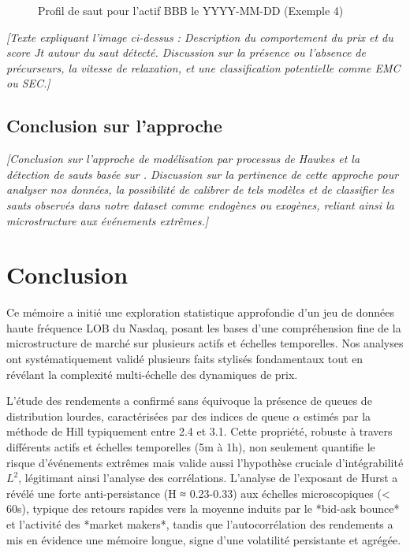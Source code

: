\documentclass[10pt,a4paper]{article}
\theoremstyle{definition}
\theoremstyle{remark}
\begin{document}
\begin{itemize}
    \vspace{1cm}

    \begin{figure}[H]
        \centering
        \fbox{\rule{0pt}{4cm}\qquad\rule{8cm}{0pt}} %
        \caption{Profil de saut pour l'actif BBB le YYYY-MM-DD (Exemple 4)}
        \label{fig:jump_example_4}
    \end{figure}
    \textit{[Texte expliquant l'image ci-dessus : Description du comportement du prix et du score Jt autour du saut détecté. Discussion sur la présence ou l'absence de précurseurs, la vitesse de relaxation, et une classification potentielle comme EMC ou SEC.]}

    \subsection{Conclusion sur l'approche}

    \textit{[Conclusion sur l'approche de modélisation par processus de Hawkes et la détection de sauts basée sur \cite{marcaccioli2021exogenous}. Discussion sur la pertinence de cette approche pour analyser nos données, la possibilité de calibrer de tels modèles et de classifier les sauts observés dans notre dataset comme endogènes ou exogènes, reliant ainsi la microstructure aux événements extrêmes.]}

\newpage
\section*{Conclusion}

    Ce mémoire a initié une exploration statistique approfondie d'un jeu de données haute fréquence LOB du Nasdaq, posant les bases d'une compréhension fine de la microstructure de marché sur plusieurs actifs et échelles temporelles. Nos analyses ont systématiquement validé plusieurs faits stylisés fondamentaux tout en révélant la complexité multi-échelle des dynamiques de prix.

    L'étude des rendements a confirmé sans équivoque la présence de queues de distribution lourdes, caractérisées par des indices de queue $\alpha$ estimés par la méthode de Hill typiquement entre 2.4 et 3.1. Cette propriété, robuste à travers différents actifs et échelles temporelles (5m à 1h), non seulement quantifie le risque d'événements extrêmes mais valide aussi l'hypothèse cruciale d'intégrabilité $L^2$, légitimant ainsi l'analyse des corrélations. L'analyse de l'exposant de Hurst a révélé une forte anti-persistance (H ≈ 0.23-0.33) aux échelles microscopiques (< 60s), typique des retours rapides vers la moyenne induits par le *bid-ask bounce* et l'activité des *market makers*, tandis que l'autocorrélation des rendements a mis en évidence une mémoire longue, signe d'une volatilité persistante et agrégée.


\end{itemize}
\end{document}
